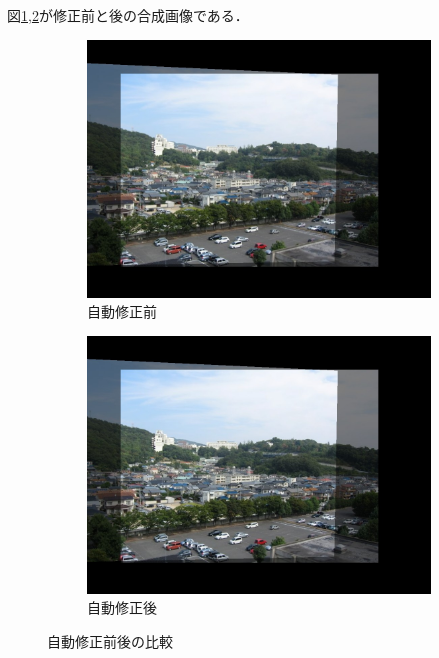\documentclass[autodetect-engine,dvi=dvipdfmx,ja=standard,
               a4j,11pt]{bxjsarticle}
\begin{document}
図\ref{fig:3.2-before.jpg},\ref{fig:3.2-after.jpg}が修正前と後の合成画像である．
\begin{figure}[h]
 \centering
 \begin{subfigure}[b]{0.45\textwidth}
   \centering
   \includegraphics[scale=0.2]{3.2-before.jpg}
   \caption{自動修正前}
   \label{fig:3.2-before.jpg}
 \end{subfigure}
 \hspace{5mm}
 \begin{subfigure}[b]{0.45\textwidth}
   \centering
   \includegraphics[scale=0.2]{3.2-after.jpg}
   \caption{自動修正後}
   \label{fig:3.2-after.jpg}
 \end{subfigure}
 \caption{自動修正前後の比較}
 \label{fig:comparison}
\end{figure}
\end{document}
